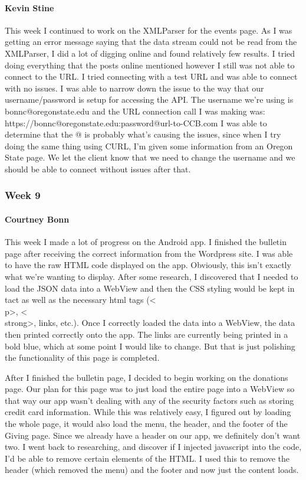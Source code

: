 			\paragraph{Kevin Stine}
			This week I continued to work on the XMLParser for the events page. As I was getting an error message saying that the data stream could not be read from the XMLParser, I did a lot of digging online and found relatively few results. I tried doing everything that the posts online mentioned however I still was not able to connect to the URL. I tried connecting with a test URL and was able to connect with no issues. I was able to narrow down the issue to the way that our username/password is setup for accessing the API. The username we're using is bonnc@oregonstate.edu and the URL connection call I was making was: https://bonnc@oregonstate.edu:password@url-to-CCB.com I was able to determine that the @ is probably what's causing the issues, since when I try doing the same thing using CURL, I'm given some information from an Oregon State page. We let the client know that we need to change the username and we should be able to connect without issues after that.

		\subsubsection{Week 9}

			\paragraph{Courtney Bonn}
			This week I made a lot of progress on the Android app. I finished the bulletin page after receiving the correct information from the Wordpress site. I was able to have the raw HTML code displayed on the app. Obviously, this isn't exactly what we're wanting to display. After some research, I discovered that I needed to load the JSON data into a WebView and then the CSS styling would be kept in tact as well as the necessary html tags (<\\p>, <\\strong>, links, etc.). Once I correctly loaded the data into a WebView, the data then printed correctly onto the app. The links are currently being printed in a bold blue, which at some point I would like to change. But that is just polishing the functionality of this page is completed.

After I finished the bulletin page, I decided to begin working on the donations page. Our plan for this page was to just load the entire page into a WebView so that way our app wasn't dealing with any of the security factors such as storing credit card information. While this was relatively easy, I figured out by loading the whole page, it would also load the menu, the header, and the footer of the Giving page. Since we already have a header on our app, we definitely don't want two. I went back to researching, and discover if I injected javascript into the code, I'd be able to remove certain elements of the HTML. I used this to remove the header (which removed the menu) and the footer and now just the content loads.

